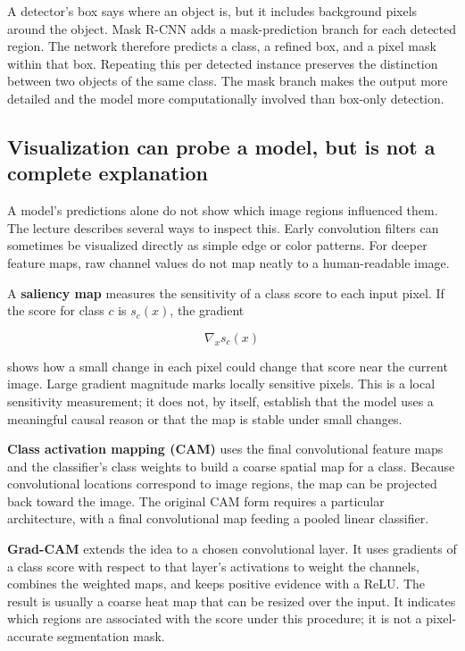 A detector's box says where an object is, but it includes background pixels around the object. Mask R-CNN adds a mask-prediction branch for each detected region. The network therefore predicts a class, a refined box, and a pixel mask within that box. Repeating this per detected instance preserves the distinction between two objects of the same class. The mask branch makes the output more detailed and the model more computationally involved than box-only detection.

\subsection{Visualization can probe a model, but is not a complete explanation}\label{04-visual-computing-ii-ch031-visualization-can-probe-a-model-but-is-not-a-complete-explanation}

A model's predictions alone do not show which image regions influenced them. The lecture describes several ways to inspect this. Early convolution filters can sometimes be visualized directly as simple edge or color patterns. For deeper feature maps, raw channel values do not map neatly to a human-readable image.

A \textbf{saliency map} measures the sensitivity of a class score to each input pixel. If the score for class \(c\) is \(s_c(x)\), the gradient

\[
\nabla_x s_c(x)
\]

shows how a small change in each pixel could change that score near the current image. Large gradient magnitude marks locally sensitive pixels. This is a local sensitivity measurement; it does not, by itself, establish that the model uses a meaningful causal reason or that the map is stable under small changes.

\textbf{Class activation mapping (CAM)} uses the final convolutional feature maps and the classifier's class weights to build a coarse spatial map for a class. Because convolutional locations correspond to image regions, the map can be projected back toward the image. The original CAM form requires a particular architecture, with a final convolutional map feeding a pooled linear classifier.

\textbf{Grad-CAM} extends the idea to a chosen convolutional layer. It uses gradients of a class score with respect to that layer's activations to weight the channels, combines the weighted maps, and keeps positive evidence with a ReLU. The result is usually a coarse heat map that can be resized over the input. It indicates which regions are associated with the score under this procedure; it is not a pixel-accurate segmentation mask.

